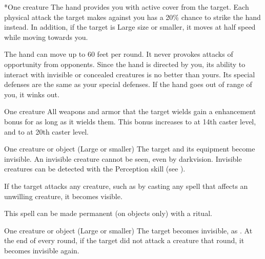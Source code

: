 \begin{spelltarget}*{One creature}
    \spelleffect The hand provides you with active cover from the target. Each physical attack the target makes against you has a 20\% chance to strike the hand instead. In addition, if the target is Large size or smaller, it moves at half speed while moving towards you.
\end{spelltarget}
\spellnotes The hand can move up to 60 feet per round. It never provokes attacks of opportunity from opponents. Since the hand is directed by you, its ability to interact with invisible or concealed creatures is no better than yours. Its special defenses are the same as your special defenses. If the hand goes out of range of you, it winks out.

\spellrng{\rngclose}
\spelldur{\durshort}
\begin{spelltarget}{One creature}
    \spelleffect All weapons and armor that the target wields gain a  enhancement bonus for as long as it wields them. This bonus increases to  at 14th caster level, and to  at 20th caster level.
\end{spelltarget}

\spellrng{\rngclose}
\spelldur{\durshort \dismissable}
\begin{spelltarget}{One creature or object (Large or smaller)}
    \spelleffect The target and its equipment become invisible. An invisible creature cannot be seen, even by darkvision. Invisible creatures can be detected with the Perception skill (see ).

    If the target attacks any creature, such as by casting any spell that affects an unwilling creature, it becomes visible.
\end{spelltarget}
\spellnotes This spell can be made permanent (on objects only) with a  ritual.

\spellrng{\rngclose}
\spelldur{\durshort \dismissable}
\begin{spelltarget}{One creature or object (Large or smaller)}
    \spelleffect The target becomes invisible, as . At the end of every round, if the target did not attack a creature that round, it becomes invisible again.
\end{spelltarget}


